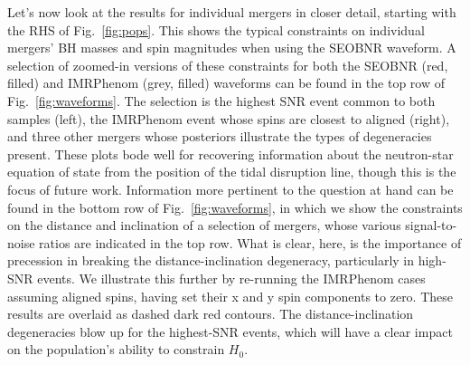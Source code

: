 \documentclass[twocolumn]{aastex63}
\begin{document}
\begin{figure*}[ht!]
\caption{Cosmological and population parameter posteriors inferred for the simulated SEOBNR (left) and IMRPhenom (right) NSBH samples.\label{fig:cosmo}}
\end{figure*}

Let's now look at the results for individual mergers in closer detail, starting with the RHS of Fig.~\ref{fig:pops}. This shows the typical constraints on individual mergers' BH masses and spin magnitudes when using the SEOBNR waveform. A selection of zoomed-in versions of these constraints for both the SEOBNR (red, filled) and IMRPhenom (grey, filled) waveforms can be found in the top row of Fig.~\ref{fig:waveforms}. The selection is the highest SNR event common to both samples (left), the IMRPhenom event whose spins are closest to aligned (right), and three other mergers whose posteriors illustrate the types of degeneracies present. These plots bode well for recovering information about the neutron-star equation of state from the position of the tidal disruption line, though this is the focus of future work. Information more pertinent to the question at hand can be found in the bottom row of Fig.~\ref{fig:waveforms}, in which we show the constraints on the distance and inclination of a selection of mergers, whose various signal-to-noise ratios are indicated in the top row. What is clear, here, is the importance of precession in breaking the distance-inclination degeneracy, particularly in high-SNR events. We illustrate this further by re-running the IMRPhenom cases assuming aligned spins, having set their x and y spin components to zero. These results are overlaid as dashed dark red contours. The distance-inclination degeneracies blow up for the highest-SNR events, which will have a clear impact on the population's ability to constrain $H_0$.

\begin{figure*}[ht!]
\caption{Posterior distributions for mergers simulated using the IMRPhenom waveform with precessing (grey filled) and aligned (dark red dashed) spins, and the SEOBNR waveform (red) with aligned spins. Each column depicts the distance, inclination, and black-hole mass and $z$-spin magnitude posteriors for a merger with true parameters indicated by black plus symbols (crosses where the true $z$-spin is negative). Shown are: (left) the merger with the highest signal-to-noise, (right) the two IMRPhenom mergers whose black-hole spins are closest to being aligned, and (center) two further mergers indicating the range of posteriors observed. \label{fig:waveforms}}
\end{figure*}
\end{document}

